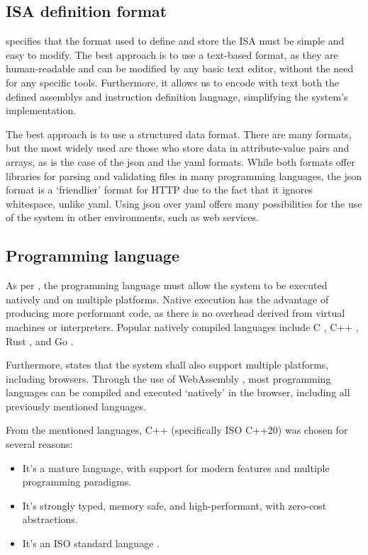 \subsection{ISA definition format}
 specifies that the format used to define and store the \gls{ISA} must be simple and easy to modify. The best approach is to use a text-based format, as they are human-readable and can be modified by any basic text editor, without the need for any specific tools. Furthermore, it allows us to encode with text  both the defined \glspl{assembly} and \gls{instruction} definition language, simplifying the system's implementation.

The best approach is to use a structured data format. There are many formats, but the most widely used are those who store data in attribute-value pairs and arrays, as is the case of the \gls{json} \parencite{ISO21778} and the \gls{yaml} \parencite{yamlspec} formats. While both formats offer libraries for parsing and validating files in many programming languages, the \gls{json} format is a `friendlier' format for \gls{HTTP} due to the fact that it ignores whitespace, unlike \gls{yaml}. Using \gls{json} over \gls{yaml} offers many possibilities for the use of the system in other environments, such as \glspl{web service}.


\subsection{Programming language}
As per , the \gls{programming language} must allow the system to be executed natively and on multiple platforms. Native execution has the advantage of producing more performant code, as there is no overhead derived from virtual machines or \glspl{interpreter}. Popular natively compiled languages include C \parencite{KernighanBrianW1988TCpl}, C++ \parencite{StroustrupBjarne2013TCpl}, Rust \parencite{KlabnikSteve2023TRpl}, and Go \parencite{DonovanAlan2015TGPL} \parencite{statista2023langstats}.

Furthermore,  states that the system shall also support multiple platforms, including browsers. Through the use of WebAssembly \parencite{HaasAndreas2017Btwu}, most programming languages can be compiled and executed `natively' in the browser, including all previously mentioned languages.

From the mentioned languages, C++ (specifically ISO C++20) was chosen for several reasons:
\begin{itemize}[nosep]
  \item It's a mature language, with support for modern features and multiple \glspl{programming paradigm}.
  \item It's strongly typed, memory safe, and high-performant, with zero-cost abstractions.
  \item It's an ISO standard language \parencite{ISOcpp20}.
\end{itemize}



